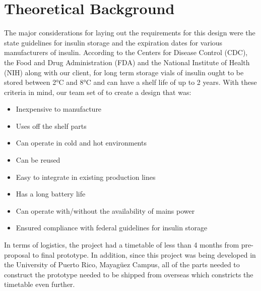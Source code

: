 \section{Theoretical Background}
The major considerations for laying out the requirements for this design were the state guidelines for insulin storage and the expiration dates for various manufacturers of insulin. According to the Centers for Disease Control (CDC)\cite{ManagingInsulinEmergency2022}, the Food and Drug Administration (FDA) \cite{researchInformationRegardingInsulin2018} and the National Institute of Health (NIH) \cite{bahendekaEADSGGuidelinesInsulin2019} along with our client, for long term storage vials of insulin ought to be stored between 2\si{\celsius} and 8\si{\celsius} and can have a shelf life of up to 2 years. With these criteria in mind, our team set of to create a design that was:
\begin{itemize}
  \item Inexpensive to manufacture
  \item Uses off the shelf parts
  \item Can operate in cold and hot environments
  \item Can be reused
  \item Easy to integrate in existing production lines
  \item Has a long battery life
  \item Can operate with/without the availability of mains power
  \item Ensured compliance with federal guidelines for insulin storage
\end{itemize}
In terms of logistics, the project had a timetable of less than 4 months from pre-proposal to final prototype. In addition, since this project was being developed in the University of Puerto Rico, Mayagüez Campus, all of the parts needed to construct the prototype needed to be shipped from overseas which constricts the timetable even further.\\

